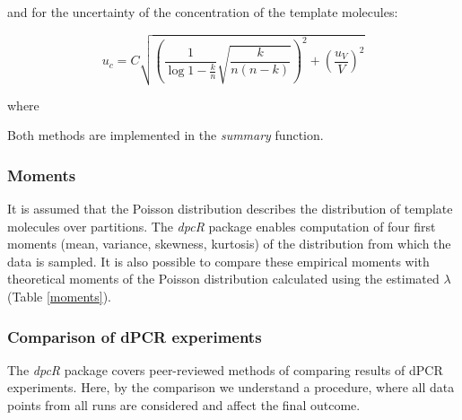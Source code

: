 \documentclass[a4,center,fleqn]{NAR}
\begin{document}
and for the uncertainty of the concentration of the template molecules:

\begin{equation}
u_{c} = C \sqrt{ \left( \frac{1}{\log{1 - \frac{k}{n} }} 
\sqrt{\frac{k}{n (n - k)}} \right)^2 
+ \left( \frac{u_V}{V} \right)^2}
\end{equation}

where

Both methods are implemented in the \textit{summary} function.

\subsubsection{Moments}

\begin{table}[b]
 {}
\end{table}

It is assumed that the Poisson distribution describes the distribution of 
template molecules over partitions. The \textit{dpcR} package enables 
computation of four first moments (mean, variance, skewness, kurtosis) of the 
distribution from which the data is sampled. It is also possible to compare 
these empirical moments with theoretical moments of the Poisson distribution 
calculated using the estimated $\lambda$ (Table \ref{moments}).

\subsubsection{Comparison of dPCR experiments}
The \textit{dpcR} package covers peer-reviewed methods of comparing results of 
dPCR experiments. Here, by the comparison we understand a procedure, where all 
data points from all runs are considered and affect the final outcome. 
\end{document}
